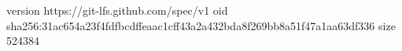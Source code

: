 version https://git-lfs.github.com/spec/v1
oid sha256:31ac654a23f4fdfbcdffeaac1cff43a2a432bda8f269bb8a51f47a1aa63df336
size 524384
